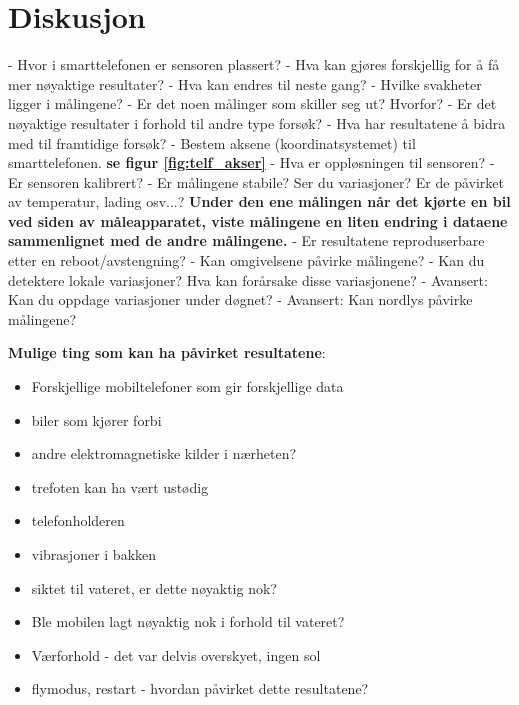 \section{Diskusjon}

- Hvor i smarttelefonen er sensoren plassert? \newline 
- Hva kan gjøres forskjellig for å få mer nøyaktige resultater? - Hva kan endres til neste gang? \newline
- Hvilke svakheter ligger i målingene? \newline
- Er det noen målinger som skiller seg ut? Hvorfor? \newline
- Er det nøyaktige resultater i forhold til andre type forsøk? \newline 
- Hva har resultatene å bidra med til framtidige forsøk? \newline                                    
- Bestem aksene (koordinatsystemet) til smarttelefonen. \textbf{se figur \ref{fig:telf_akser} }\newline 
- Hva er oppløsningen til sensoren? \newline 
- Er sensoren kalibrert? \newline
- Er målingene stabile? Ser du variasjoner? Er de påvirket av temperatur, lading
osv...? \textbf{Under den ene målingen når det kjørte en bil ved siden av måleapparatet, viste målingene en liten endring i dataene sammenlignet med de andre målingene. }\newline
- Er resultatene reproduserbare etter en reboot/avstengning? \newline
- Kan omgivelsene påvirke målingene? \newline                      
- Kan du detektere lokale variasjoner? Hva kan forårsake disse variasjonene?  \newline
- Avansert: Kan du oppdage variasjoner under døgnet? \newline
- Avansert: Kan nordlys påvirke målingene? \newline 

\noindent\textbf{Mulige ting som kan ha påvirket resultatene}:
\begin{itemize}
    \item Forskjellige mobiltelefoner som gir forskjellige data 
    \item biler som kjører forbi
    \item andre elektromagnetiske kilder i nærheten? 
    \item trefoten kan ha vært ustødig
    \item telefonholderen
    \item vibrasjoner i bakken               
    \item siktet til vateret, er dette nøyaktig nok?
    \item Ble mobilen lagt nøyaktig nok i forhold til vateret?
    \item Værforhold - det var delvis overskyet, ingen sol
    \item flymodus, restart - hvordan påvirket dette resultatene?

\end{itemize}
